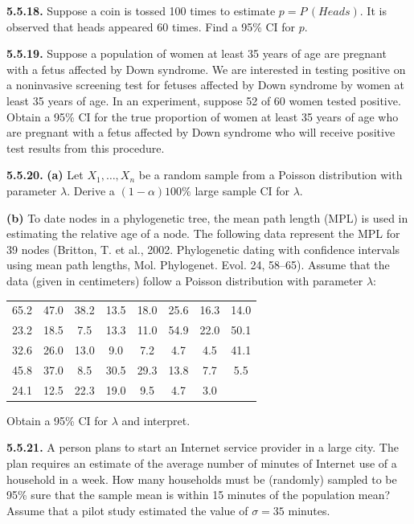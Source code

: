\textbf{5.5.18.} Suppose a coin is tossed 100 times to estimate $p = P\,(Heads)$. It is observed that heads appeared 60 times. Find a 95\% CI for $p$.

\textbf{5.5.19.} Suppose a population of women at least 35 years of age are pregnant with a fetus affected by Down syndrome. We are interested in testing positive on a noninvasive screening test for fetuses affected by Down syndrome by women at least 35 years of age. In an experiment, suppose 52 of 60 women tested positive. Obtain a 95\% CI for the true proportion of women at least 35 years of age who are pregnant with a fetus affected by Down syndrome who will receive positive test results from this procedure.

\textbf{5.5.20.} \quad \textbf{(a)} Let $X_1, \ldots, X_n$ be a random sample from a Poisson distribution with parameter $\lambda$. Derive a $(1-\alpha)100\%$ large sample CI for $\lambda$.

\textbf{(b)} To date nodes in a phylogenetic tree, the mean path length (MPL) is used in estimating the relative age of a node. The following data represent the MPL for 39 nodes (Britton, T. et al., 2002. Phylogenetic dating with confidence intervals using mean path lengths, Mol. Phylogenet. Evol. 24, 58--65). Assume that the data (given in centimeters) follow a Poisson distribution with parameter $\lambda$:

\begin{center}
\begin{tabular}{cccccccc}
65.2 & 47.0 & 38.2 & 13.5 & 18.0 & 25.6 & 16.3 & 14.0 \\
23.2 & 18.5 & 7.5 & 13.3 & 11.0 & 54.9 & 22.0 & 50.1 \\
32.6 & 26.0 & 13.0 & 9.0 & 7.2 & 4.7 & 4.5 & 41.1 \\
45.8 & 37.0 & 8.5 & 30.5 & 29.3 & 13.8 & 7.7 & 5.5 \\
24.1 & 12.5 & 22.3 & 19.0 & 9.5 & 4.7 & 3.0 & \\
\end{tabular}
\end{center}

Obtain a 95\% CI for $\lambda$ and interpret.

\textbf{5.5.21.} A person plans to start an Internet service provider in a large city. The plan requires an estimate of the average number of minutes of Internet use of a household in a week. How many households must be (randomly) sampled to be 95\% sure that the sample mean is within 15 minutes of the population mean? Assume that a pilot study estimated the value of $\sigma = 35$ minutes.

